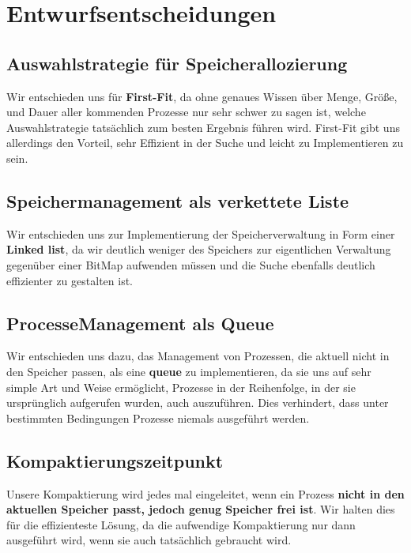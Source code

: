 \section{Entwurfsentscheidungen}
\subsection{Auswahlstrategie für Speicherallozierung}
Wir entschieden uns für \textbf{First-Fit}, da ohne genaues Wissen über Menge, Größe, und Dauer aller kommenden Prozesse nur sehr schwer zu sagen ist, welche Auswahlstrategie tatsächlich zum besten Ergebnis führen wird. First-Fit gibt uns allerdings den Vorteil, sehr Effizient in der Suche und leicht zu Implementieren zu sein.

\subsection{Speichermanagement als verkettete Liste}
Wir entschieden uns zur Implementierung der Speicherverwaltung in Form einer \textbf{Linked list}, da wir deutlich weniger des Speichers zur eigentlichen Verwaltung gegenüber einer BitMap aufwenden müssen und die Suche ebenfalls deutlich effizienter zu gestalten ist.

\subsection{ProcesseManagement als Queue}
Wir entschieden uns dazu, das Management von Prozessen, die aktuell nicht in den Speicher passen, als eine \textbf{queue} zu implementieren, da sie uns auf sehr simple Art und Weise ermöglicht, Prozesse in der Reihenfolge, in der sie ursprünglich aufgerufen wurden, auch auszuführen. Dies verhindert, dass unter bestimmten Bedingungen Prozesse niemals ausgeführt werden.

\subsection{Kompaktierungszeitpunkt}
Unsere Kompaktierung wird jedes mal eingeleitet, wenn ein Prozess \textbf{nicht in den aktuellen Speicher passt, jedoch genug Speicher frei ist}. Wir halten dies für die effizienteste Lösung, da die aufwendige Kompaktierung nur dann ausgeführt wird, wenn sie auch tatsächlich gebraucht wird.
